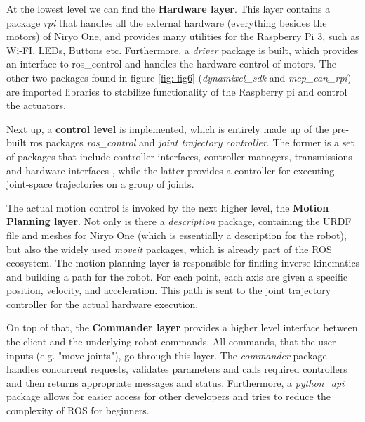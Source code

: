 \documentclass[%
paper=A4,               %
twoside=true,           %
openright,              %
11pt,                   %
bibliography=totoc,     %
titlepage=on,           %
DIV=12,                 %
BCOR=1.5cm,             %
parskip=half,            %
final
]{scrreprt}
\begin{document}
	At the lowest level we can find the \textbf{Hardware layer}. This layer contains a package \textit{rpi} that handles all the external hardware (everything besides the motors) of Niryo One, and provides many utilities for the Raspberry Pi 3, such as Wi-FI, LEDs, Buttons etc. Furthermore, a \textit{driver} package is built, which provides an interface to ros\_control and handles the hardware control of motors. The other two packages found in figure \ref{fig: fig6} (\textit{dynamixel\_sdk} and \textit{mcp\_can\_rpi}) are imported libraries to stabilize functionality of the Raspberry pi and control the actuators. \autocite{roboticsNiryoOneROS2024} \newline
	
	Next up, a \textbf{control level} is implemented, which is entirely made up of the pre-built ros packages \textit{ros\_control} and \textit{joint trajectory controller}. The former is a set of packages that include controller interfaces, controller managers, transmissions and hardware interfaces \autocite{ros.orgROSControl2024a}, while the latter provides a controller for executing joint-space trajectories on a group of joints. \autocite{ros.orgJointTrajectoryController2024} \newline
	
	The actual motion control is invoked by the next higher level, the \textbf{Motion Planning layer}. Not only is there a \textit{description} package, containing the URDF file and meshes for Niryo One (which is essentially a description for the robot), but also the widely used \textit{moveit} packages, which is already part of the ROS ecosystem. The motion planning layer is responsible for finding inverse kinematics and building a path for the robot.\autocite{roboticsGetStartedNiryo2024,ros.orgMoveItConcepts2024} For each point, each axis are given a specific position, velocity, and acceleration. This path is sent to the joint trajectory controller for the actual hardware execution. \autocite{roboticsGetStartedNiryo2024}
	
	On top of that, the \textbf{Commander layer} provides a higher level interface between the client and the underlying robot commands. All commands, that the user inputs (e.g. "move joints"), go through this layer. The \textit{commander} package handles concurrent requests, validates parameters and calls required controllers and then returns appropriate messages and status. 
	Furthermore, a \textit{python\_api} package allows for easier access for other developers and tries to reduce the complexity of ROS for beginners. \autocite{roboticsGetStartedNiryo2024,roboticsNiryoOneROS2024}
	
\end{document}
